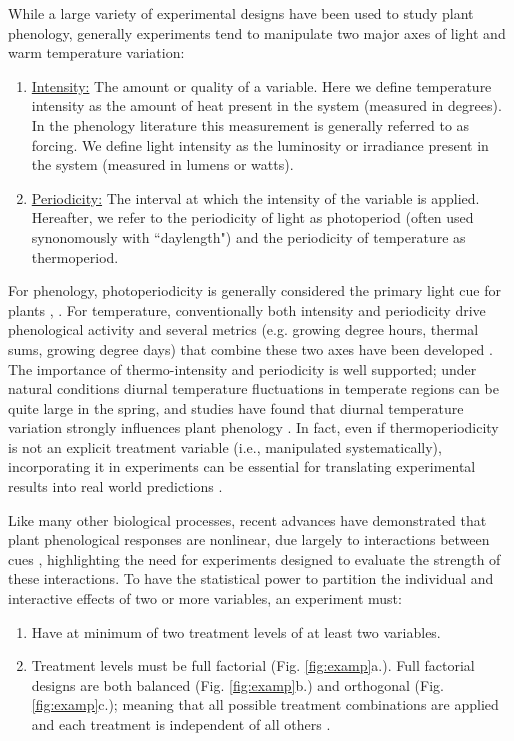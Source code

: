 \documentclass[11pt]{article}
\begin{document}
While a large variety of experimental designs have been used to study plant phenology, generally experiments tend to manipulate two major axes of light and warm temperature variation:
\begin{enumerate}
\item \underline{Intensity:} The amount or quality of a variable. Here we define temperature intensity as the amount of heat present in the system (measured in degrees). In the phenology literature this measurement is generally referred to as forcing. We define light intensity as the luminosity or irradiance present in the system (measured in lumens or watts). 
\item \underline{Periodicity:} The interval at which the intensity of the variable is applied. Hereafter, we refer to the periodicity of light as photoperiod (often used synonomously with ``daylength") and the periodicity of temperature as thermoperiod. 
\end{enumerate}
For phenology, photoperiodicity is generally considered the primary light cue for plants \citep{WAY:2015aa}, \citep[though regarding light intensity and phenology see][]{Brelsford2018,Cober1996}. For temperature, conventionally both intensity and periodicity drive phenological activity and several metrics (e.g. growing degree hours, thermal sums, growing degree days)  that combine these two axes have been developed \citep{Gu:2016wa}. The importance of thermo-intensity and periodicity is well supported; under natural conditions diurnal temperature fluctuations in temperate regions can be quite large in the spring, and studies have found that diurnal temperature variation strongly influences plant phenology \citep{Burghardt:2016uy}. In fact, even if thermoperiodicity is not an explicit treatment variable (i.e., manipulated systematically), incorporating it in experiments can be essential for translating experimental results into real world predictions \citep{plants9101312}.

Like many other biological processes, recent advances have demonstrated that plant phenological responses are nonlinear, due largely to interactions between cues \citep{Wolkovich_2022,fu2015}, highlighting the need for experiments designed to evaluate the strength of these interactions. To have the statistical power to partition the individual and interactive effects of two or more variables, an experiment must:
\begin{enumerate}
\item Have at minimum of two treatment levels of at least two variables.
\item Treatment levels must be full factorial (Fig. \ref{fig:examp}a.). Full factorial designs are both balanced (Fig. \ref{fig:examp}b.)  and orthogonal (Fig. \ref{fig:examp}c.); meaning that all possible treatment combinations are applied and each treatment is independent of all others \citep{cheng2016}.
\end{enumerate}
\end{document}
